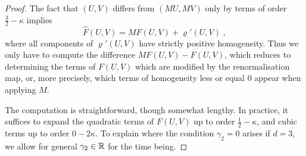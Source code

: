 \documentclass[reqno,11pt]{article}
\begin{document}
\begin{proof}
The fact that $(U,V)$ differs from $(MU,MV)$ only by terms of order
$\frac32-\kappa$ implies 
\[
 \widehat F(U,V) = MF(U,V) + \varrho'(U,V)\;,
\]
where all components of $\varrho'(U,V)$ have strictly positive homogeneity.
Thus we only have to compute the difference $MF(U,V) - F(U,V)$, which
reduces to determining the terms of $F(U,V)$ which are modified by the
renormalisation map, or, more precisely, which terms of homogeneity less or
equal $0$ appear when applying $M$. 

The computation is straightforward, though somewhat lengthy. In practice, it
suffices to expand the quadratic terms of $F(U,V)$ up to order
$\frac12-\kappa$, and cubic terms up to order $0-2\kappa$. To explain where the
condition $\gamma_2=0$ arises if $d=3$, we allow for general $\gamma_2\in\mathbb{R}$ for
the time being. 


\end{proof}
\end{document}

